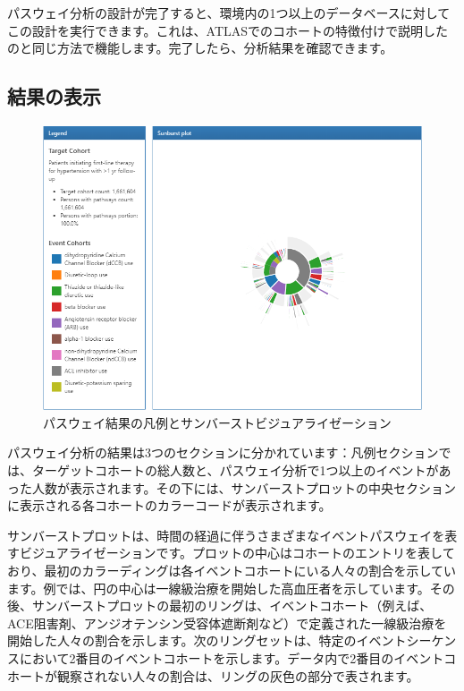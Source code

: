 \documentclass[
  11pt]{book}
\theoremstyle{definition}
\theoremstyle{definition}
\theoremstyle{definition}
\theoremstyle{definition}
\theoremstyle{remark}
\begin{document}
パスウェイ分析の設計が完了すると、環境内の1つ以上のデータベースに対してこの設計を実行できます。これは、ATLASでのコホートの特徴付けで説明したのと同じ方法で機能します。完了したら、分析結果を確認できます。

\subsection{結果の表示}\label{ux7d50ux679cux306eux8868ux793a}

\begin{figure}

{\centering \includegraphics[width=1\linewidth]{images/Characterization/atlasPathwaysResults} 

}

\caption{パスウェイ結果の凡例とサンバーストビジュアライゼーション}\label{fig:atlasPathwaysResults}
\end{figure}

パスウェイ分析の結果は3つのセクションに分かれています：凡例セクションでは、ターゲットコホートの総人数と、パスウェイ分析で1つ以上のイベントがあった人数が表示されます。その下には、サンバーストプロットの中央セクションに表示される各コホートのカラーコードが表示されます。

サンバーストプロットは、時間の経過に伴うさまざまなイベントパスウェイを表すビジュアライゼーションです。プロットの中心はコホートのエントリを表しており、最初のカラーディングは各イベントコホートにいる人々の割合を示しています。例では、円の中心は一線級治療を開始した高血圧者を示しています。その後、サンバーストプロットの最初のリングは、イベントコホート（例えば、ACE阻害剤、アンジオテンシン受容体遮断剤など）で定義された一線級治療を開始した人々の割合を示します。次のリングセットは、特定のイベントシーケンスにおいて2番目のイベントコホートを示します。データ内で2番目のイベントコホートが観察されない人々の割合は、リングの灰色の部分で表されます。
\end{document}
